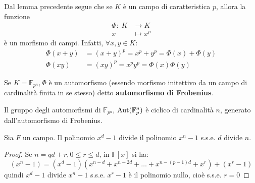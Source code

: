 \documentclass[../main.tex]{subfiles}
\begin{document}
\begin{definition}
    Dal lemma precedente segue che se $K$ è un campo di caratteristica $p$, allora la funzione
    \begin{align*}
        \Phi : \; K & \rightarrow K \\
        x           & \mapsto x^p
    \end{align*}
    è un morfismo di campi. Infatti, $\forall x,y \in K$:
    \begin{align*}
        \Phi(x + y) & = (x + y)^p = x^p + y^p = \Phi(x) + \Phi(y) \\
        \Phi(xy)    & = (xy)^p = x^p y^p = \Phi(x) \Phi(y)
    \end{align*}

    Se $K = \mathbb{F}_{p^n}, \Phi$ è un automorfismo (essendo morfismo initettivo da un campo di cardinalità finita in se stesso) detto \textbf{automorfismo di Frobenius}.
\end{definition}

\begin{theorem}
    Il gruppo degli automorfismi di $\mathbb{F}_{p^n}$, $\operatorname{Aut}(\mathbb{F}_p^n)$ è ciclico di cardinalità $n$, generato dall'automorfismo di Frobenius.
\end{theorem}

\begin{lemma}
    Sia $F$ un campo. Il polinomio $x^d - 1$ divide il polinomio $x^n - 1$ s.s.e. $d$ divide $n$.
\end{lemma}
\begin{proof}
    Se $n = qd + r, 0 \leq r \leq d$, in $\mathbb{F}[x]$ si ha:
    \begin{equation*}
        (x^n - 1) = (x^d - 1)(x^{n-d} + x^{n-2d} + \ldots + x^{n-(p-1)d} + x^r) + (x^r -1)
    \end{equation*}
    quindi $x^d - 1$ divide $x^n - 1$ s.s.e. $x^r - 1$ è il polinomio nullo, cioè s.s.e. $r = 0$
\end{proof}
\end{document}
